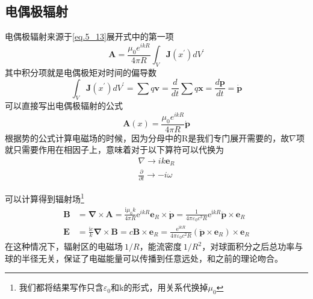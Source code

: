     \subsection{电偶极辐射}
        电偶极辐射来源于\ref{eq.5_13}展开式中的第一项
        \begin{equation}
            \boldsymbol{A} = \frac{\mu_0 e^{ikR}}{4 \pi R}\int_V \boldsymbol{J}(x^\prime) dV^\prime
        \end{equation}
        其中积分项就是电偶极矩对时间的偏导数\[\int_V \boldsymbol{J}(x^\prime)dV^\prime= \sum q \boldsymbol{v}=\frac{d}{d t}\sum q \boldsymbol{x}=\frac{d \boldsymbol{p}}{d t}=\boldsymbol{\dot{p}}\]可以直接写出电偶极辐射的公式
        \begin{equation}
            \boldsymbol{A}(x) = \frac{\mu_0 e^{i k R}}{4 \pi R}\boldsymbol{\dot{p}}
        \end{equation}
        根据势的公式计算电磁场的时候，因为分母中的R是我们专门展开需要的，故$\nabla$项就只需要作用在相因子上，意味着对于以下算符可以代换为
        \begin{equation}
            \label{eq.5_17}
            \boxed{\begin{gathered}
                \nabla \to i k \boldsymbol{e}_R \\
                \frac{\partial }{\partial t} \to -i \omega 
            \end{gathered}}
        \end{equation}

        可以计算得到辐射场\footnote{我们都将结果写作只含$\varepsilon_0$和k的形式，用关系代换掉$\mu_0$}
        \begin{equation}
            \begin{aligned}
            \boldsymbol{B} &=\boldsymbol{\nabla} \times \boldsymbol{A}=\frac{\mathrm{i} \mu_{0} k}{4 \pi R} \mathrm{e}^{i k R} \boldsymbol{e}_{R} \times \dot{\boldsymbol{p}}=\frac{1}{4 \pi \varepsilon_{0} c^{3} R} \mathrm{e}^{\mathrm{i} k R} \ddot{\boldsymbol{p}} \times \boldsymbol{e}_{R} \\
            \boldsymbol{E} &=\frac{\mathrm{i} c}{k} \boldsymbol{\nabla} \times \boldsymbol{B}=c \boldsymbol{B} \times \boldsymbol{e}_{R}=\frac{\mathrm{e}^{\mathrm{i} k R}}{4 \pi \varepsilon_{0} c^{2} R}\left(\ddot{\boldsymbol{p}} \times \boldsymbol{e}_{R}\right) \times \boldsymbol{e}_{R}
            \end{aligned}
        \end{equation}
        在这种情况下，辐射区的电磁场$~1/R$，能流密度$~1/R^2$，对球面积分之后总功率与球的半径无关，保证了电磁能量可以传播到任意远处，和之前的理论吻合。
        
